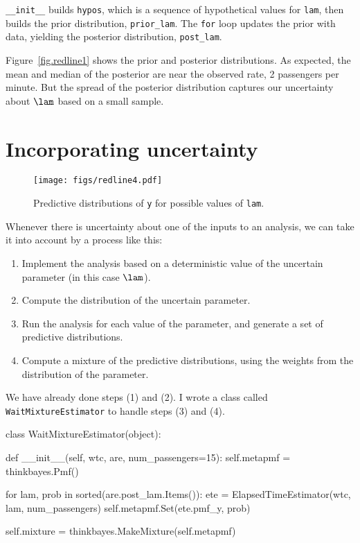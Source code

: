 \documentclass[12pt]{book}
\theoremstyle{exercise}
\newcommand{\py}[1]{{\tt #1}}%
\begin{document}
\verb"__init__" builds
\py{hypos}, which is a sequence of hypothetical values for \py{lam},
then builds the prior distribution, \verb"prior_lam".
The \py{for} loop updates the prior with data, yielding the posterior
distribution, \verb"post_lam".

Figure~\ref{fig.redline1} shows
the prior and posterior distributions.  As expected, the mean and
median of the posterior are near the observed rate, 2 passengers per
minute.  But the spread of the posterior distribution captures our
uncertainty about $\lam$ based on a small sample.


\section{Incorporating uncertainty}

\begin{figure}
\centerline{\texttt{[image: figs/redline4.pdf]}}
\caption{Predictive distributions of \py{y} for possible values
  of \py{lam}. }
\label{fig.redline4}
\end{figure}

Whenever there is uncertainty about one of the inputs to an analysis,
we can take it into account by a process like this:

\begin{enumerate}

\item Implement the analysis based on a deterministic value of the
  uncertain parameter (in this case $\lam$).

\item Compute the distribution of the uncertain parameter.

\item Run the analysis for each value of the parameter, and generate a
  set of predictive distributions.

\item Compute a mixture of the predictive distributions, using the
  weights from the distribution of the parameter.

\end{enumerate}

We have already done steps (1) and (2).  I wrote a class
called \py{WaitMixtureEstimator} to handle steps (3) and (4).

\begin{code}
class WaitMixtureEstimator(object):

    def __init__(self, wtc, are, num_passengers=15):
        self.metapmf = thinkbayes.Pmf()

        for lam, prob in sorted(are.post_lam.Items()):
            ete = ElapsedTimeEstimator(wtc, lam, num_passengers)
            self.metapmf.Set(ete.pmf_y, prob)

        self.mixture = thinkbayes.MakeMixture(self.metapmf)
\end{code}
\end{document}

